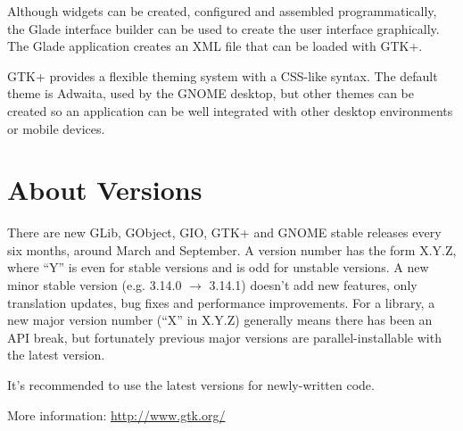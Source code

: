 \documentclass[a4paper,notumble]{leaflet}
\begin{document}
Although widgets can be created, configured and assembled programmatically, the Glade interface builder can be used to create the user interface graphically. The Glade application creates an XML file that can be loaded with GTK+.

GTK+ provides a flexible theming system with a CSS-like syntax. The default theme is Adwaita, used by the GNOME desktop, but other themes can be created so an application can be well integrated with other desktop environments or mobile devices.

\section{About Versions}

There are new GLib, GObject, GIO, GTK+ and GNOME stable releases every six months, around March and September. A version number has the form X.Y.Z, where ``Y'' is even for stable versions and is odd for unstable versions. A new minor stable version (e.g. 3.14.0 $\rightarrow$ 3.14.1) doesn't add new features, only translation updates, bug fixes and performance improvements. For a library, a new major version number (``X'' in X.Y.Z) generally means there has been an API break, but fortunately previous major versions are parallel-installable with the latest version.

It's recommended to use the latest versions for newly-written code.

More information: \url{http://www.gtk.org/}
\end{document}
